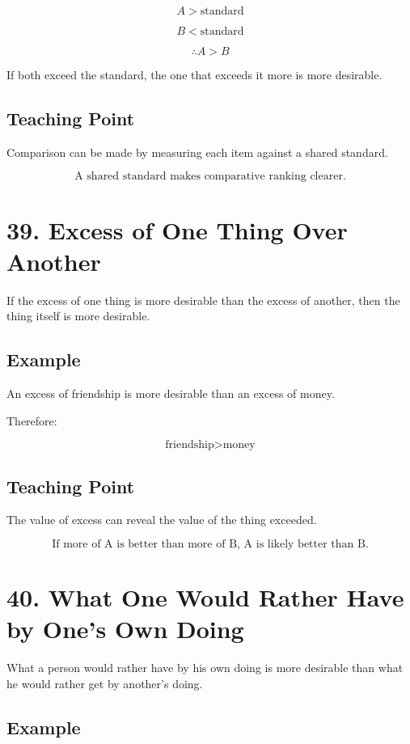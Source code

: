 \documentclass[12pt]{article}
\begin{document}
\[
A > \text{standard}
\]

\[
B < \text{standard}
\]

\[
\therefore A > B
\]

If both exceed the standard, the one that exceeds it more is more desirable.

\subsection*{Teaching Point}

Comparison can be made by measuring each item against a shared standard.

\[
\boxed{
\text{A shared standard makes comparative ranking clearer.}
}
\]

\section*{39. Excess of One Thing Over Another}

If the excess of one thing is more desirable than the excess of another, then
the thing itself is more desirable.

\subsection*{Example}

An excess of friendship is more desirable than an excess of money.

Therefore:

\[
\text{friendship} > \text{money}
\]

\subsection*{Teaching Point}

The value of excess can reveal the value of the thing exceeded.

\[
\boxed{
\text{If more of A is better than more of B, A is likely better than B.}
}
\]

\section*{40. What One Would Rather Have by One's Own Doing}

What a person would rather have by his own doing is more desirable than what he
would rather get by another's doing.

\subsection*{Example}
\end{document}
